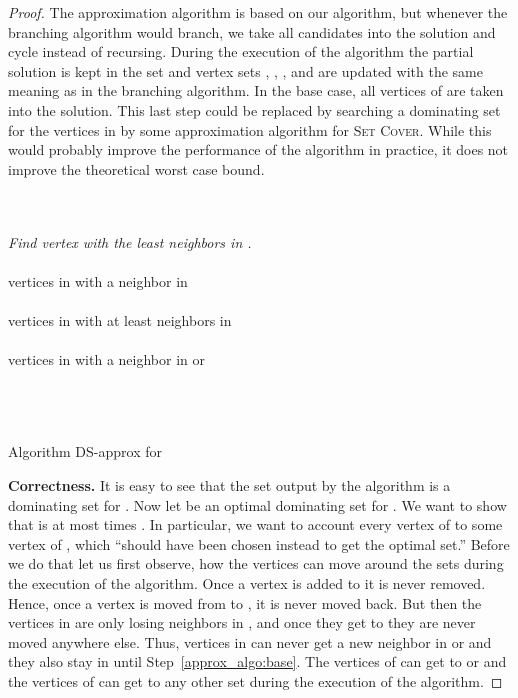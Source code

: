  \begin{proof}
The approximation algorithm is based on our {\FPT} algorithm, but whenever the branching algorithm would branch, we take all candidates into the solution and cycle instead of recursing. During the execution of the algorithm the partial solution is kept in the set  and vertex sets , , , and  are updated with the same meaning as in the branching algorithm. In the base case, all vertices of  are taken into the solution. This last step could be replaced by searching a dominating set for the vertices in  by some approximation algorithm for \textsc{Set Cover}. While this would probably improve the performance of the algorithm in practice, 
it does not 
improve the theoretical worst case bound.

\begin{algorithm}[t]
\\
\\
\While{}
{\emph{Find vertex  with the least neighbors in .}\label{approx_algo:find}\\
\label{approx_algo:branch}\\
 vertices in  with a neighbor in \\
\\
 vertices in  with at least  neighbors in \\
\\
 vertices in  with a neighbor in  or \\
\\
}
\label{approx_algo:base}\\
\Return \\
\BlankLine
\caption{Algorithm {\sc DS-approx} for {\ds}}\label{algo:approx_domset}
\end{algorithm}

 \noindent
{\bf Correctness.}
It is easy to see that the set  output by the algorithm is a dominating set for . Now let  be an optimal dominating set for . We want to show that  is at most  times . In particular, we want to account every vertex of  to some vertex of , which ``should have been chosen instead to get the optimal set.'' Before we do that let us first observe, how the vertices can move around the sets during the execution of the algorithm. Once a vertex is added to  it is never removed. Hence, once a vertex is moved from  to , it is never moved back. But then the vertices in  are only losing neighbors in , and once they get to  they are never moved anywhere else. Thus, vertices in  can never get a new neighbor in  or  and they also stay in  until Step~\ref{approx_algo:base}. The vertices of  can get to  or  and the vertices of  can get to any other set during the execution of the algorithm.


\end{proof}
